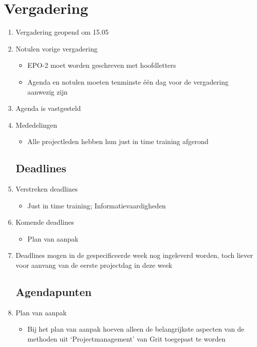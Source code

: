 \documentclass{article}
\begin{document}
\section*{Vergadering}
\begin{enumerate}
	
	\subsection*{Vooraf}
	\item Vergadering geopend om 15.05%
	\item Notulen vorige vergadering
	\begin{itemize}
		\item EPO-2 moet worden geschreven met hoofdletters
		\item Agenda en notulen moeten tenminste één dag voor de vergadering aanwezig zijn
	\end{itemize}
	\item Agenda is vastgesteld
	\item Mededelingen
	\begin{itemize}
		\item Alle projectleden hebben hun just in time training afgerond
	\end{itemize}

	\subsection*{Deadlines}
	\item Verstreken deadlines
	\begin{itemize}
		\item Just in time training; Informatievaardigheden
	\end{itemize}
	\item Komende deadlines
	\begin{itemize}
		\item Plan van aanpak
	\end{itemize}
	\item Deadlines mogen in de gespecificeerde week nog ingeleverd worden, toch liever voor aanvang van de eerste projectdag in deze week

	\subsection*{Agendapunten}
	\item Plan van aanpak
	\begin{itemize}
		\item Bij het plan van aanpak hoeven alleen de belangrijkste aspecten van de methoden uit `Projectmanagement' van Grit toegepast te worden
	\end{itemize}


\end{enumerate}
\end{document}
